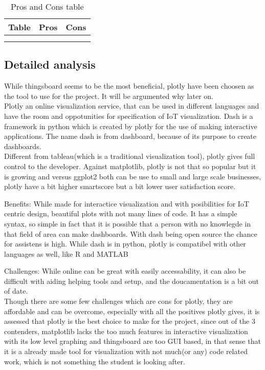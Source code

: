 \documentclass{article}
\begin{document}
    \begin{table}[]
        \centering
        \begin{tabular}{c|c|c}
        \hline
        Table & Pros & Cons \\
        \hline
             & \\
             & 
        \end{tabular}
        \caption{Pros and Cons table}
        \label{tab:my_label}
    \end{table}
    
\subsection{Detailed analysis}
	While thingsboard seems to be the most beneficial, plotly have been choosen as the tool to use for the project. It will be argumented why later on. 
	\\Plotly an online visualization service, that can be used in different languages and have the room and oppotunities for specification of IoT visualization. Dash is a framework in python which is created by plotly for the use of making  interactive applications. The name dash is from dashboard, because of its purpose to create dashboards. 
	\\Different from tableau(which is a traditional visualization tool), plotly gives full control to the developer. Against matplotlib, plotly is not that so popular but it is growing and versus ggplot2 both can be use to small and large scale businesses, plotly have a bit higher smartscore but a bit lower user satisfaction score.
	
	Benefits: 
		While made for interactice visualization and with posibilities for IoT centric design, beautiful plots with not many lines of code. It has a simple syntax, so simple in fact that it is possible that a person with no knowlegde in that field of area can make dashboards. With dash being open source the chance for assistens is high. While dash is in python, plotly is compatibel with other languages as well, like R and MATLAB
		
	Challenges: 
        While online can be great with easily accessability, it can also be difficult with aiding helping tools and setup, and the doucamentation is a bit out of date. 
        \\Though there are some few challenges which are cons for plotly, they are affordable and can be overcome, especially with all the positives plotly gives, it is assessed that plotly is the best choice to make for the project, since out of the 3 contenders, matplotlib lacks the too much features in interactive visualization with its low level graphing and thingsboard are too GUI based, in that sense that it is a already made tool for visualization with not much(or any) code related work, which is not something the student is looking after.



\end{document}
